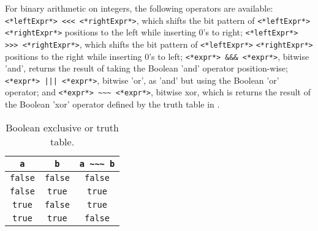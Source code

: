 For binary arithmetic on integers, the following operators are available:
\lstinline[language=syntax]{<*leftExpr*> <<< <*rightExpr*>}, which shifts the bit pattern of \lstinline[language=syntax]|<*leftExpr*>| \lstinline[language=syntax]|<*rightExpr*>| positions to the left while inserting 0's to right;
\lstinline[language=syntax]{<*leftExpr*> >>> <*rightExpr*>}, which shifts the bit pattern of \lstinline[language=syntax]|<*leftExpr*>| \lstinline[language=syntax]|<*rightExpr*>| positions to the right while inserting 0's to left;
\lstinline[language=syntax]{<*expr*> &&& <*expr*>}, bitwise 'and', returns the result of taking the Boolean 'and' operator position-wise;
\lstinline[language=syntax]{<*expr*> ||| <*expr*>}, bitwise 'or', as 'and' but using the Boolean 'or' operator; and
\lstinline[language=syntax]{<*expr*> ~~~ <*expr*>}, bitwise xor, which is returns the result of the Boolean 'xor' operator defined by the truth table in .
\begin{table}
  \centering
  \begin{tabular}{|c|c|c|}
    \hline
    \rowcolor{headerRowColor} \lstinline!a! & \lstinline!b! & \lstinline!a ~~~ b!\\
    \hline
    \lstinline!false! & \lstinline!false! & \lstinline!false!\\
    \lstinline!false! & \lstinline!true! & \lstinline!true!\\
    \lstinline!true! & \lstinline!false! & \lstinline!true!\\
    \lstinline!true! & \lstinline!true! & \lstinline!false!\\
    \hline
  \end{tabular}
  \caption{Boolean exclusive or truth table.}
  \label{tab:xor}
\end{table}
%

